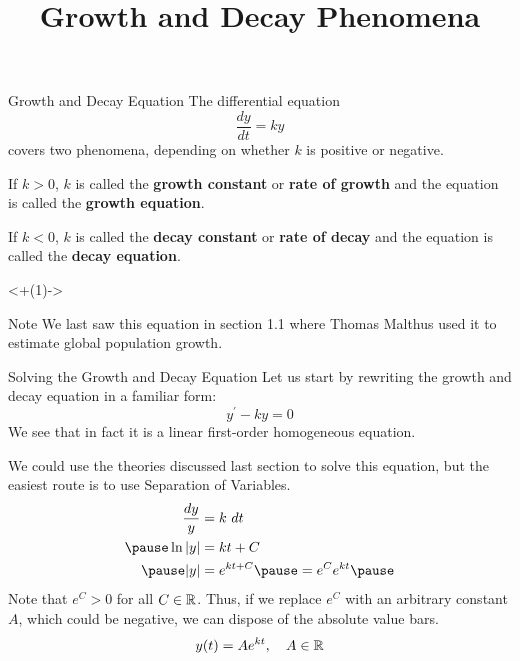 \documentclass{beamer}
\title[MA245 - Section 2.3]{Growth and Decay Phenomena}
\begin{document}
\begin{frame}
\titlepage
\end{frame}

\begin{frame}
\begin{block}{Growth and Decay Equation}
The differential equation
\begin{equation*}
\dfrac{dy}{dt} = ky
\end{equation*}
covers two phenomena, depending on whether $k$ is positive or negative.
\begin{description}[<+(1)- | alert@+>] %
\item[Growth:] If $k>0$, $k$ is called the \textbf{growth constant} or \textbf{rate of growth} and the equation is called the \textbf{growth equation}.
\item[Decay:] If $k<0$, $k$ is called the \textbf{decay constant} or \textbf{rate of decay} and the equation is called the \textbf{decay equation}.
\end{description}
\end{block}
\onslide<+(1)-> %
\begin{block}{Note}
We last saw this equation in section 1.1 where Thomas Malthus used it to estimate global population growth.
\end{block}
\end{frame}

\begin{frame}
\begin{block}{Solving the Growth and Decay Equation}
Let us start by rewriting the growth and decay equation in a familiar form:
\begin{equation*}
y^\prime - ky = 0
\end{equation*}\pause
We see that in fact it is a linear first-order homogeneous equation.\pause

\vspace{2mm}
We could use the theories discussed last section to solve this equation, but the easiest route is to use Separation of Variables.
\begin{equation*}
\begin{aligned}
\dfrac{dy}{y} &= k~dt \\ \pause
\ln\abs{y} &= kt + C \\ \pause
\abs{y} &= e^{kt+C} \pause = e^C e^{kt}\pause
\end{aligned}
\end{equation*}
Note that $e^C>0$ for all $C\in\mathbb{R}$. Thus, if we replace $e^C$ with an arbitrary constant $A$, which could be negative, we can dispose of the absolute value bars.
\begin{equation*}
y(t) = Ae^{kt},\quad A\in\mathbb{R}
\end{equation*}
\end{block}
\end{frame}
\end{document}
